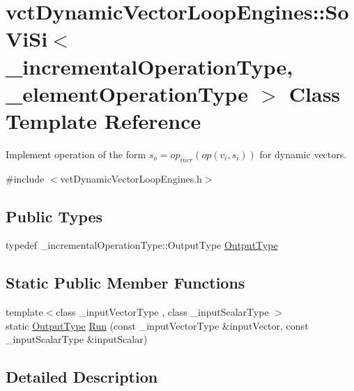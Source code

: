 \hypertarget{classvct_dynamic_vector_loop_engines_1_1_so_vi_si}{}\section{vct\+Dynamic\+Vector\+Loop\+Engines\+:\+:So\+Vi\+Si$<$ \+\_\+incremental\+Operation\+Type, \+\_\+element\+Operation\+Type $>$ Class Template Reference}
\label{classvct_dynamic_vector_loop_engines_1_1_so_vi_si}


Implement operation of the form $s_o = op_{incr}(op(v_i, s_i))$ for dynamic vectors.  




{\ttfamily \#include $<$vct\+Dynamic\+Vector\+Loop\+Engines.\+h$>$}

\subsection*{Public Types}
\begin{DoxyCompactItemize}
\item 
typedef \+\_\+incremental\+Operation\+Type\+::\+Output\+Type \hyperlink{classvct_dynamic_vector_loop_engines_1_1_so_vi_si_a331ca8ec7bde5a60281e490a5d8c396a}{Output\+Type}
\end{DoxyCompactItemize}
\subsection*{Static Public Member Functions}
\begin{DoxyCompactItemize}
\item 
{\footnotesize template$<$class \+\_\+input\+Vector\+Type , class \+\_\+input\+Scalar\+Type $>$ }\\static \hyperlink{classvct_dynamic_vector_loop_engines_1_1_so_vi_si_a331ca8ec7bde5a60281e490a5d8c396a}{Output\+Type} \hyperlink{classvct_dynamic_vector_loop_engines_1_1_so_vi_si_ab3ca377ecc892e18570f076476c63b1e}{Run} (const \+\_\+input\+Vector\+Type \&input\+Vector, const \+\_\+input\+Scalar\+Type \&input\+Scalar)
\end{DoxyCompactItemize}


\subsection{Detailed Description}
